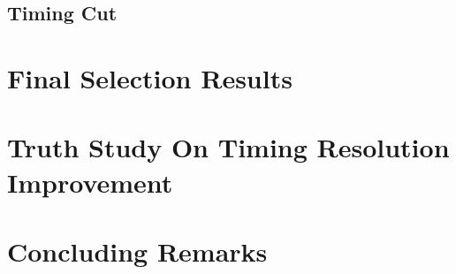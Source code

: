 \subsection{Timing Cut}


\section{Final Selection Results}


\section{Truth Study On Timing Resolution Improvement}


\section{Concluding Remarks}

